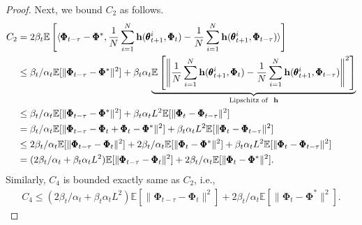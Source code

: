 \documentclass{article} %
\theoremstyle{plain}
\theoremstyle{definition}
\theoremstyle{remark}
\begin{document}
{\begin{proof}
Next, we bound $C_2$ as follows.
\begin{align*}
C_2&=2\beta_t\mathbb{E}\left[\langle\pmb{\Phi}_{t-\tau}-\pmb{\Phi}^*, \frac{1}{N}\sum_{i=1}^N\bh(\pmb{\theta}_{t+1}^i, \pmb{\Phi}_t)- \frac{1}{N}\sum_{i=1}^N\bh(\pmb{\theta}_{t+1}^i, \pmb{\Phi}_{t-\tau})\rangle\right]\allowdisplaybreaks\\
&\leq \beta_t/\alpha_t\mathbb{E}[\|\pmb{\Phi}_{t-\tau}-\pmb{\Phi}^*\|^2]+\beta_t\alpha_t\underset{\text{Lipschitz of }~\bh}{\underbrace{\mathbb{E}\left[\left\|\frac{1}{N}\sum_{i=1}^N\bh(\pmb{\theta}_{t+1}^i, \pmb{\Phi}_t)- \frac{1}{N}\sum_{i=1}^N\bh(\pmb{\theta}_{t+1}^i, \pmb{\Phi}_{t-\tau})\right\|^2\right]}}\allowdisplaybreaks\\
&\leq  \beta_t/\alpha_t\mathbb{E}[\|\pmb{\Phi}_{t-\tau}-\pmb{\Phi}^*\|^2]+ \beta_t\alpha_t L^2\mathbb{E}[\|\pmb{\Phi}_t-\pmb{\Phi}_{t-\tau}\|^2]\allowdisplaybreaks\\
&=  \beta_t/\alpha_t\mathbb{E}[\|\pmb{\Phi}_{t-\tau}-\pmb{\Phi}_t+\pmb{\Phi}_t-\pmb{\Phi}^*\|^2]+ \beta_t\alpha_t L^2\mathbb{E}[\|\pmb{\Phi}_t-\pmb{\Phi}_{t-\tau}\|^2]\allowdisplaybreaks\\
&\leq 2\beta_t/\alpha_t\mathbb{E}[\|\pmb{\Phi}_{t-\tau}-\pmb{\Phi}_t\|^2]+2\beta_t/\alpha_t\mathbb{E}[\|\pmb{\Phi}_t-\pmb{\Phi}^*\|^2]+ \beta_t\alpha_t L^2\mathbb{E}[\|\pmb{\Phi}_t-\pmb{\Phi}_{t-\tau}\|^2]\allowdisplaybreaks\\
&= (2\beta_t/\alpha_t+\beta_t\alpha_t L^2)\mathbb{E}[\|\pmb{\Phi}_{t-\tau}-\pmb{\Phi}_t\|^2]+2\beta_t/\alpha_t\mathbb{E}[\|\pmb{\Phi}_t-\pmb{\Phi}^*\|^2].
\end{align*}
Similarly, $C_4$ is bounded exactly same as $C_2$, i.e., 
\begin{align*}
    C_4\leq (2\beta_t/\alpha_t+\beta_t\alpha_t L^2)\mathbb{E}[\|\pmb{\Phi}_{t-\tau}-\pmb{\Phi}_t\|^2]+2\beta_t/\alpha_t\mathbb{E}[\|\pmb{\Phi}_t-\pmb{\Phi}^*\|^2].
\end{align*}


\end{proof}}
\end{document}
